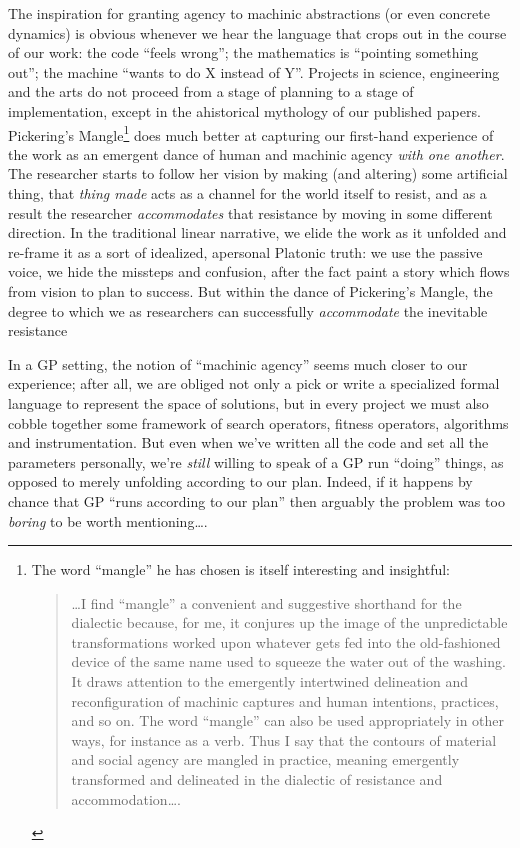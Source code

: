The inspiration for granting agency to machinic abstractions (or even concrete dynamics) is obvious whenever we hear the language that crops out in the course of our work: the code ``feels wrong''; the mathematics is ``pointing something out''; the machine ``wants to do X instead of Y''. Projects in science, engineering and the arts do not proceed from a stage of planning to a stage of implementation, except in the ahistorical mythology of our published papers. Pickering's Mangle\footnote{The word ``mangle'' he has chosen is itself interesting and insightful:

\begin{quote}
\ldots{}I find ``mangle'' a convenient and suggestive shorthand for the dialectic because, for me, it conjures up the image of the unpredictable transformations worked upon whatever gets fed into the old-fashioned device of the same name used to squeeze the water out of the washing. It draws attention to the emergently intertwined delineation and reconfiguration of machinic captures and human intentions, practices, and so on. The word ``mangle'' can also be used appropriately in other ways, for instance as a verb. Thus I say that the contours of material and social agency are mangled in practice, meaning emergently transformed and delineated in the dialectic of resistance and accommodation\ldots{}.
\end{quote}} does much better at capturing our first-hand experience of the work as an emergent dance of human and machinic agency \emph{with one another}. The researcher starts to follow her vision by making (and altering) some artificial thing, that \emph{thing made} acts as a channel for the world itself to resist, and as a result the researcher \emph{accommodates} that resistance by moving in some different direction. In the traditional linear narrative, we elide the work as it unfolded and re-frame it as a sort of idealized, apersonal Platonic truth: we use the passive voice, we hide the missteps and confusion, after the fact paint a story which flows from vision to plan to success. But within the dance of Pickering's Mangle, the degree to which we as researchers can successfully \emph{accommodate} the inevitable resistance

In a GP setting, the notion of ``machinic agency'' seems much closer to our experience; after all, we are obliged not only a pick or write a specialized formal language to represent the space of solutions, but in every project we must also cobble together some framework of search operators, fitness operators, algorithms and instrumentation. But even when we've written all the code and set all the parameters personally, we're \emph{still} willing to speak of a GP run ``doing'' things, as opposed to merely unfolding according to our plan. Indeed, if it happens by chance that GP ``runs according to our plan'' then arguably the problem was too \emph{boring} to be worth mentioning\ldots{}.


